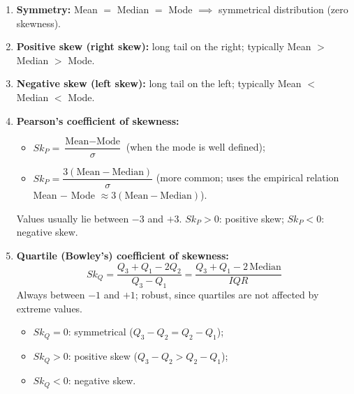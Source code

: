 \documentclass[11pt]{article}
\begin{document}
\begin{methode}
\begin{enumerate}
    \item \textbf{Symmetry:} Mean $=$ Median $=$ Mode $\implies$ symmetrical distribution (zero skewness).
    \item \textbf{Positive skew (right skew):} long tail on the right; typically Mean $>$ Median $>$ Mode.
    \item \textbf{Negative skew (left skew):} long tail on the left; typically Mean $<$ Median $<$ Mode.
    \item \textbf{Pearson's coefficient of skewness:}
    \begin{itemize}
        \item $Sk_P = \dfrac{\text{Mean} - \text{Mode}}{\sigma}$ (when the mode is well defined);
        \item $Sk_P = \dfrac{3(\text{Mean} - \text{Median})}{\sigma}$ (more common; uses the empirical relation Mean $-$ Mode $\approx 3(\text{Mean} - \text{Median})$).
    \end{itemize}
    Values usually lie between $-3$ and $+3$. $Sk_P > 0$: positive skew; $Sk_P < 0$: negative skew.
    \item \textbf{Quartile (Bowley's) coefficient of skewness:}
    \[ Sk_Q = \frac{Q_3 + Q_1 - 2Q_2}{Q_3 - Q_1} = \frac{Q_3 + Q_1 - 2\,\text{Median}}{IQR} \]
    Always between $-1$ and $+1$; robust, since quartiles are not affected by extreme values.
    \begin{itemize}
        \item $Sk_Q = 0$: symmetrical ($Q_3 - Q_2 = Q_2 - Q_1$);
        \item $Sk_Q > 0$: positive skew ($Q_3 - Q_2 > Q_2 - Q_1$);
        \item $Sk_Q < 0$: negative skew.
    \end{itemize}
\end{enumerate}
\end{methode}
\end{document}
